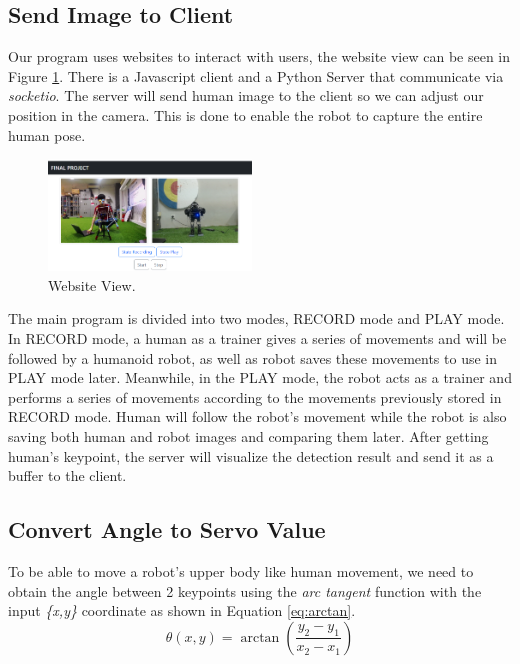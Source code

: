 \subsection{Send Image to Client}
\label{subsec:send-image-to-client}

Our program uses websites to interact with users, the website view can be seen in Figure \ref{fig:websiteview}. There is a Javascript client and a Python Server that communicate via \emph{socketio}.
The server will send human image to the client so we can adjust our position in the camera. This is done to enable the robot to capture the entire human pose.
\begin{figure}[ht]
  \centering
  \includegraphics[width=0.48\textwidth]{gambar/web.png}
  \caption{Website View.}
  \label{fig:websiteview}
\end{figure}
The main program is divided into two modes, RECORD mode and PLAY mode. In RECORD mode, a human as a trainer gives a series of movements and will be followed by a humanoid robot, as well as robot saves these movements to use in PLAY mode later.
Meanwhile, in the PLAY mode, the robot acts as a trainer and performs a series of movements according to the movements previously stored in RECORD mode. Human will follow the robot's movement while the robot is also saving both human and robot images and comparing them later. After getting human's keypoint, the server will visualize the detection result and send it as a buffer to the client.


\subsection{Convert Angle to Servo Value}
\label{subsec:convert-angle-to-servo-value}

To be able to move a robot's upper body like human movement, we need to obtain the angle between 2 keypoints using the \emph{arc tangent} function with the input \emph{\{x,y\}} coordinate as shown in Equation \ref{eq:arctan}.
\begin{equation}
  \label{eq:arctan}
  \theta (x, y) = \arctan \left(\frac{y_2 - y_1}{x_2 - x_1}\right)
\end{equation}

